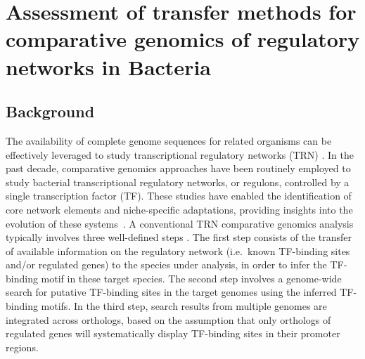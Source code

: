 
\chapter{Assessment of transfer methods for comparative genomics of regulatory
  networks in Bacteria}
\label{chap:transfer}

\section{Background}

The availability of complete genome sequences for related organisms can be
effectively leveraged to study transcriptional regulatory networks (TRN)
\citep{babu2008computational}. In the past decade, comparative genomics
approaches have been routinely employed to study bacterial transcriptional
regulatory networks, or regulons, controlled by a single transcription factor
(TF). These studies have enabled the identification of core network elements
and niche-specific adaptations, providing insights into the evolution of these
systems~\citep{tan2001comparative, makarova2001conservation,
  erill2004differences, venancio2009reconstructing, baumbach2010power,
  rodionov2013transcriptional}. A conventional TRN comparative genomics
analysis typically involves three well-defined steps
\citep{babu2008computational, gelfand2000comparative, baumbach2009reliable}. The
first step consists of the transfer of available information on the regulatory
network (i.e.\ known TF-binding sites and/or regulated genes) to the species
under analysis, in order to infer the TF-binding motif in these target
species. The second step involves a genome-wide search for putative TF-binding
sites in the target genomes using the inferred TF-binding motifs. In the third
step, search results from multiple genomes are integrated across orthologs,
based on the assumption that only orthologs of regulated genes will
systematically display TF-binding sites in their promoter regions.

